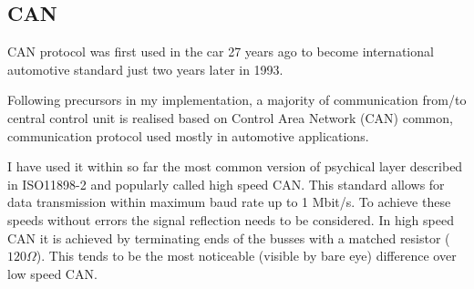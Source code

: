 \subsection{CAN}
CAN protocol was first used in the car 27 years ago to become international automotive standard just two years later in 1993.\cite{CAN_merc, CAN_1993}

\noindent
Following precursors in my implementation, a majority of communication from/to central control unit is realised based on Control Area Network (CAN) common, communication protocol used mostly in automotive applications. 

I have used it within so far the most common version of psychical layer described in ISO11898-2 and popularly called high speed CAN. This standard allows for data transmission within maximum baud rate up to 1 Mbit/s. To achieve these speeds without errors the signal reflection needs to be considered. In high speed CAN it is achieved by terminating ends of the busses with a matched resistor ($120\Omega$). This tends to be the most noticeable (visible by bare eye) difference over low speed CAN.

